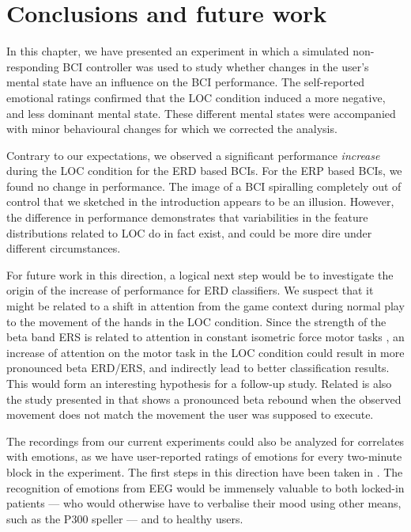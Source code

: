 \section{Conclusions and future work}
\begin{sloppypar}
In this chapter, we have presented an experiment in which a simulated 
non-responding \ac{BCI} controller was used to study whether changes
in the user's mental state have an influence on the \ac{BCI} performance. The
self-reported emotional ratings confirmed that the \ac{LOC} condition induced a
more negative, and less dominant mental state. These different mental states
were accompanied with minor behavioural changes for which we corrected the
analysis.
\end{sloppypar}

Contrary to our expectations, we observed a significant performance
\emph{increase} during the \ac{LOC} condition for the \ac{ERD} based \acp{BCI}.
For the \ac{ERP} based \acp{BCI}, we found no change in performance. The image
of a \ac{BCI} spiralling completely out of control that we sketched in the
introduction appears to be an illusion. However, the difference in performance
demonstrates that variabilities in the feature distributions related to
\ac{LOC} do in fact exist, and could be more dire under different
circumstances.

For future work in this direction, a logical next step would be to
investigate the origin of the increase of performance for \ac{ERD}
classifiers. We suspect that it might be related to a shift in attention from
the game context during normal play to the movement of the hands in the
\ac{LOC} condition. 
%
Since the strength of the beta band \ac{ERS} is related to attention in
constant isometric force motor tasks \cite{kirsteva-feige2002eap}, an increase
of attention on the motor task in the \ac{LOC} condition could result in more
pronounced beta \ac{ERD}/\ac{ERS}, and indirectly lead to better classification
results. This would form an interesting hypothesis for a follow-up study.
%
Related is also the study presented in \cite{koelewijn2008mcb} that shows a
pronounced beta rebound when the observed movement does not match the movement
the user was supposed to execute.
 
The recordings from our current experiments could also be analyzed for
correlates with emotions, as we have user-reported ratings of emotions for
every two-minute block in the experiment.  The first steps in this direction
have been taken in \cite{reuderink2012vad}. The recognition of emotions from
\ac{EEG} would be immensely valuable to both locked-in patients --- who would
otherwise have to verbalise their mood using other means, such as the P300
speller --- and to healthy users.
